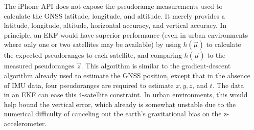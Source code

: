 \documentclass[10pt]{article}
\begin{document}
The iPhone API does not expose the pseudorange measurements used to calculate the GNSS latitude, longitude, and altitude. It merely provides a latitude, longitude, altitude, horizontal accuracy, and vertical accuracy. In principle, an EKF would have superior performance (even in urban environments where only one or two satellites may be available) by using $h(\vec{\mu})$ to calculate the expected pseudoranges to each satellite, and comparing $h(\vec{\mu})$ to the measured pseudoranges $\vec{z}$. This algorithm is similar to the gradient-descent algorithm already used to estimate the GNSS position, except that in the absence of IMU data, four pseudoranges are required to estimate $x, y, z$, and $t$. The data in an EKF can ease this 4-satellite constraint. In urban environments, this would help bound the vertical error, which already is somewhat unstable due to the numerical difficulty of canceling out the earth's gravitational bias on the z-accelerometer.

  
%
 
\end{document}
